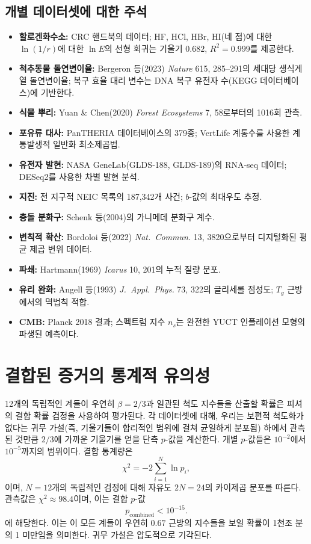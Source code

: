 \documentclass[11pt,a4paper]{article}
\begin{document}
\subsection*{개별 데이터셋에 대한 주석}
\begin{itemize}
	\item \textbf{할로겐화수소:} CRC 핸드북의 데이터; HF, HCl, HBr, HI(네 점)에 대한 \(\ln(1/r)\)에 대한 \(\ln E\)의 선형 회귀는 기울기 \(0.682\), \(R^2=0.999\)를 제공한다.
	\item \textbf{척추동물 돌연변이율:} Bergeron 등(2023) \textit{Nature} 615, 285–291의 세대당 생식계열 돌연변이율; 복구 효율 대리 변수는 DNA 복구 유전자 수(KEGG 데이터베이스)에 기반한다.
	\item \textbf{식물 뿌리:} Yuan \& Chen(2020) \textit{Forest Ecosystems} 7, 58로부터의 1016회 관측.
	\item \textbf{포유류 대사:} PanTHERIA 데이터베이스의 379종; VertLife 계통수를 사용한 계통발생적 일반화 최소제곱법.
	\item \textbf{유전자 발현:} NASA GeneLab(GLDS‑188, GLDS‑189)의 RNA‑seq 데이터; DESeq2를 사용한 차별 발현 분석.
	\item \textbf{지진:} 전 지구적 NEIC 목록의 187,342개 사건; \(b\)-값의 최대우도 추정.
	\item \textbf{충돌 분화구:} Schenk 등(2004)의 가니메데 분화구 계수.
	\item \textbf{변칙적 확산:} Bordoloi 등(2022) \textit{Nat.\ Commun.} 13, 3820으로부터 디지털화된 평균 제곱 변위 데이터.
	\item \textbf{파쇄:} Hartmann(1969) \textit{Icarus} 10, 201의 누적 질량 분포.
	\item \textbf{유리 완화:} Angell 등(1993) \textit{J.\ Appl.\ Phys.} 73, 322의 글리세롤 점성도; \(T_g\) 근방에서의 멱법칙 적합.
	\item \textbf{CMB:} Planck 2018 결과; 스펙트럼 지수 \(n_s\)는 완전한 YUCT 인플레이션 모형의 파생된 예측이다.
\end{itemize}

\section{결합된 증거의 통계적 유의성}

12개의 독립적인 계들이 우연히 \(\beta = 2/3\)과 일관된 척도 지수들을 산출할 확률은 피셔의 결합 확률 검정을 사용하여 평가된다. 각 데이터셋에 대해, 우리는 보편적 척도화가 없다는 귀무 가설(즉, 기울기들이 합리적인 범위에 걸쳐 균일하게 분포됨) 하에서 관측된 것만큼 \(2/3\)에 가까운 기울기를 얻을 단측 \(p\)-값을 계산한다. 개별 \(p\)-값들은 \(10^{-2}\)에서 \(10^{-5}\)까지의 범위이다. 결합 통계량은
\[
\chi^2 = -2\sum_{i=1}^{N} \ln p_i,
\]
이며, \(N=12\)개의 독립적인 검정에 대해 자유도 \(2N = 24\)의 카이제곱 분포를 따른다. 관측값은 \(\chi^2 \approx 98.4\)이며, 이는 결합 \(p\)-값
\[
p_{\mathrm{combined}} < 10^{-15}.
\]
에 해당한다. 이는 이 모든 계들이 우연히 \(0.67\) 근방의 지수들을 보일 확률이 1천조 분의 1 미만임을 의미한다. 귀무 가설은 압도적으로 기각된다.
\end{document}
